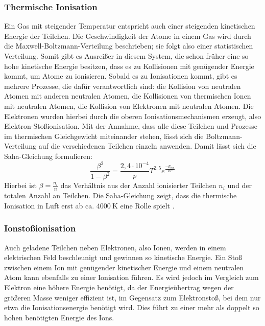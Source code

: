 \subsubsection{Thermische Ionisation}
\label{sec:thermion}
Ein Gas mit steigender Temperatur entspricht auch einer steigenden kinetischen Energie der Teilchen. Die Geschwindigkeit der Atome in einem Gas wird durch die Maxwell-Boltzmann-Verteilung beschrieben; sie folgt also einer statistischen Verteilung. Somit gibt es Ausreißer in diesem System, die schon früher eine so hohe kinetische Energie besitzen, dass es zu Kollisionen mit genügender Energie kommt, um Atome zu ionisieren. Sobald es zu Ionisationen kommt, gibt es mehrere Prozesse, die dafür verantwortlich sind: die Kollision von neutralen Atomen mit anderen neutralen Atomen, die Kollisionen von thermischen Ionen mit neutralen Atomen, die Kollision von Elektronen mit neutralen Atomen. Die Elektronen wurden hierbei durch die oberen Ionisationsmechanismen erzeugt, also Elektron-Stoßionisation. Mit der Annahme, dass alle diese Teilchen und Prozesse im thermischen Gleichgewicht miteinander stehen, lässt sich die Boltzmann-Verteilung auf die verschiedenen Teilchen einzeln anwenden. Damit lässt sich die Saha-Gleichung formulieren:
\begin{equation}
    \frac{\beta^2}{1 - \beta^2} = \frac{2,4 \cdot 10^{-4}}{p}T^{2,5}e^{\frac{-E_{ion}}{kT}}
    \label{eq:saha}
\end{equation}
Hierbei ist \(\beta = \frac{n_i}{n}\) das Verhältnis aus der Anzahl ionisierter Teilchen \(n_i\) und der totalen Anzahl an Teilchen. Die Saha-Gleichung zeigt, dass die thermische Ionisation in Luft erst ab ca. \(\SI{4000}{\kelvin}\) eine Rolle spielt \cite{kuffel2000}.

\subsubsection{Ionstoßionisation}
Auch geladene Teilchen neben Elektronen, also Ionen, werden in einem elektrischen Feld beschleunigt und gewinnen so kinetische Energie. Ein Stoß zwischen einem Ion mit genügender kinetischer Energie und einem neutralen Atom kann ebenfalls zu einer Ionisation führen. Es wird jedoch im Vergleich zum Elektron eine höhere Energie benötigt, da der Energieübertrag wegen der größeren Masse weniger effizient ist, im Gegensatz zum Elektronstoß, bei dem nur etwa die Ionisationsenergie benötigt wird. Dies führt zu einer mehr als doppelt so hohen benötigten Energie des Ions.

